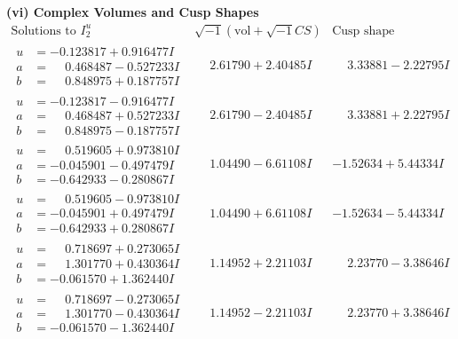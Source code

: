 \documentclass[1p]{elsarticle_modified}
\theoremstyle{definition}
\newcommand{\I}{\sqrt{-1}}
\begin{document}
\newpage\flushleft \textbf{(vi) Complex Volumes and Cusp Shapes}
$$\begin{array}{c|c|c}  
\text{Solutions to }I^u_{2}& \I (\text{vol} + \sqrt{-1}CS) & \text{Cusp shape}\\
 \hline 
\begin{aligned}
u &= -0.123817 + 0.916477 I \\
a &= \phantom{-}0.468487 - 0.527233 I \\
b &= \phantom{-}0.848975 + 0.187757 I\end{aligned}
 & \phantom{-}2.61790 + 2.40485 I & \phantom{-}3.33881 - 2.22795 I \\ \hline\begin{aligned}
u &= -0.123817 - 0.916477 I \\
a &= \phantom{-}0.468487 + 0.527233 I \\
b &= \phantom{-}0.848975 - 0.187757 I\end{aligned}
 & \phantom{-}2.61790 - 2.40485 I & \phantom{-}3.33881 + 2.22795 I \\ \hline\begin{aligned}
u &= \phantom{-}0.519605 + 0.973810 I \\
a &= -0.045901 - 0.497479 I \\
b &= -0.642933 - 0.280867 I\end{aligned}
 & \phantom{-}1.04490 - 6.61108 I & -1.52634 + 5.44334 I \\ \hline\begin{aligned}
u &= \phantom{-}0.519605 - 0.973810 I \\
a &= -0.045901 + 0.497479 I \\
b &= -0.642933 + 0.280867 I\end{aligned}
 & \phantom{-}1.04490 + 6.61108 I & -1.52634 - 5.44334 I \\ \hline\begin{aligned}
u &= \phantom{-}0.718697 + 0.273065 I \\
a &= \phantom{-}1.301770 + 0.430364 I \\
b &= -0.061570 + 1.362440 I\end{aligned}
 & \phantom{-}1.14952 + 2.21103 I & \phantom{-}2.23770 - 3.38646 I \\ \hline\begin{aligned}
u &= \phantom{-}0.718697 - 0.273065 I \\
a &= \phantom{-}1.301770 - 0.430364 I \\
b &= -0.061570 - 1.362440 I\end{aligned}
 & \phantom{-}1.14952 - 2.21103 I & \phantom{-}2.23770 + 3.38646 I \\ \hline\begin{aligned}

\end{aligned}
\end{array}$$
\end{document}
